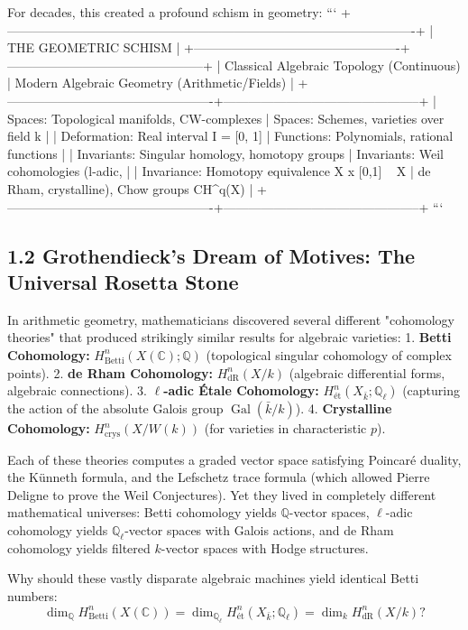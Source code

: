 \documentclass[11pt,twoside,openright]{amsbook}
\begin{document}
{For decades, this created a profound schism in geometry:
```
+-------------------------------------------------------------------------------------------------+
|                                 THE GEOMETRIC SCHISM                                            |
+-------------------------------------------------+-----------------------------------------------+
| Classical Algebraic Topology (Continuous)       | Modern Algebraic Geometry (Arithmetic/Fields) |
+-------------------------------------------------+-----------------------------------------------+
| Spaces: Topological manifolds, CW-complexes     | Spaces: Schemes, varieties over field k       |
| Deformation: Real interval I = [0, 1]           | Functions: Polynomials, rational functions    |
| Invariants: Singular homology, homotopy groups  | Invariants: Weil cohomologies (l-adic,        |
| Invariance: Homotopy equivalence X x [0,1] ~ X   | de Rham, crystalline), Chow groups CH^q(X)    |
+-------------------------------------------------+-----------------------------------------------+
```

\subsection{1.2 Grothendieck's Dream of Motives: The Universal Rosetta Stone}
In arithmetic geometry, mathematicians discovered several different "cohomology theories" that produced strikingly similar results for algebraic varieties:
1. \textbf{Betti Cohomology:} $H^n_{\mathrm{Betti}}(X(\mathbb{C}); \mathbb{Q})$ (topological singular cohomology of complex points).
2. \textbf{de Rham Cohomology:} $H^n_{\mathrm{dR}}(X / k)$ (algebraic differential forms, algebraic connections).
3. \textbf{$\ell$-adic Étale Cohomology:} $H^n_{\text{ét}}(X_{\bar{k}}; \mathbb{Q}_\ell)$ (capturing the action of the absolute Galois group $\operatorname{Gal}(\bar{k}/k)$).
4. \textbf{Crystalline Cohomology:} $H^n_{\mathrm{crys}}(X / W(k))$ (for varieties in characteristic $p$).

Each of these theories computes a graded vector space satisfying Poincaré duality, the Künneth formula, and the Lefschetz trace formula (which allowed Pierre Deligne to prove the Weil Conjectures). Yet they lived in completely different mathematical universes: Betti cohomology yields $\mathbb{Q}$-vector spaces, $\ell$-adic cohomology yields $\mathbb{Q}_\ell$-vector spaces with Galois actions, and de Rham cohomology yields filtered $k$-vector spaces with Hodge structures.

Why should these vastly disparate algebraic machines yield identical Betti numbers:
$$\dim_{\mathbb{Q}} H^n_{\mathrm{Betti}}(X(\mathbb{C})) = \dim_{\mathbb{Q}_\ell} H^n_{\text{ét}}(X_{\bar{k}}; \mathbb{Q}_\ell) = \dim_k H^n_{\mathrm{dR}}(X/k) ?$$

}
\end{document}
